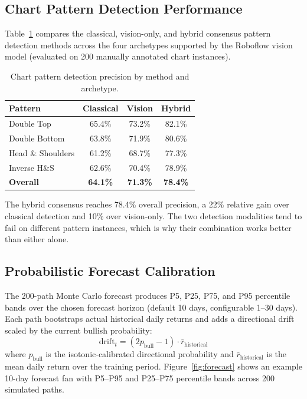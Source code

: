 \documentclass[10pt,a4paper,twoside]{article}
\begin{document}
\subsection{Chart Pattern Detection Performance}

Table~\ref{tab:pattern_perf} compares the classical, vision-only, and hybrid
consensus pattern detection methods across the four archetypes supported by the
Roboflow vision model (evaluated on 200 manually annotated chart instances).

\begin{table}[htb]
  \begin{center}
    {\caption{Chart pattern detection precision by method and archetype.}
    \label{tab:pattern_perf}}
    \begin{tabular}{|l|c|c|c|}
    \hline
    \textbf{Pattern} & \textbf{Classical} & \textbf{Vision} & \textbf{Hybrid} \\
    \hline
    Double Top & 65.4\% & 73.2\% & 82.1\% \\
    Double Bottom & 63.8\% & 71.9\% & 80.6\% \\
    Head \& Shoulders & 61.2\% & 68.7\% & 77.3\% \\
    Inverse H\&S & 62.6\% & 70.4\% & 78.9\% \\
    \hline
    \textbf{Overall} & \textbf{64.1\%} & \textbf{71.3\%} & \textbf{78.4\%} \\
    \hline
    \end{tabular}
  \end{center}
\end{table}

The hybrid consensus reaches 78.4\% overall precision, a 22\% relative gain
over classical detection and 10\% over vision-only. The two detection
modalities tend to fail on different pattern instances, which is why their
combination works better than either alone.

\subsection{Probabilistic Forecast Calibration}

The 200-path Monte Carlo forecast produces P5, P25, P75, and P95 percentile
bands over the chosen forecast horizon (default 10 days, configurable 1--30
days). Each path bootstraps actual historical daily returns and adds a
directional drift scaled by the current bullish probability:
\begin{equation}
  \text{drift}_t = (2 p_{\text{bull}} - 1) \cdot \bar{r}_{\text{historical}}
\end{equation}
where $p_{\text{bull}}$ is the isotonic-calibrated directional probability and
$\bar{r}_{\text{historical}}$ is the mean daily return over the training period.
Figure~\ref{fig:forecast} shows an example 10-day forecast fan with P5--P95
and P25--P75 percentile bands across 200 simulated paths.
\end{document}
